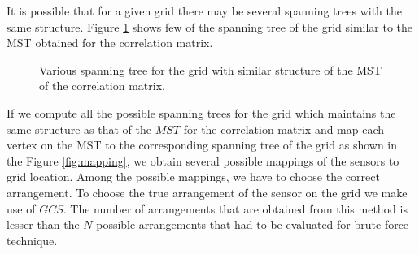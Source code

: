It is possible that for a given grid there may be several spanning trees with the same structure. 
Figure \ref{fig:variousMappings} shows few of the spanning tree of the grid similar to the MST obtained for the correlation matrix.
\begin{figure}[!ht]

\caption{Various spanning tree for the grid with similar structure of the MST of the correlation matrix.}
\label{fig:variousMappings}
\end{figure}


If we compute all the possible spanning trees for the grid which maintains the same structure as that of the $MST$ for the correlation matrix and map each vertex on the MST to the corresponding spanning tree of the grid as shown in the Figure \ref{fig:mapping}, we obtain several possible mappings of the sensors to grid location. Among the possible mappings, we have to choose the correct arrangement. To choose the true arrangement of the sensor on the grid we make use of  $GCS$. 
The number of arrangements that are obtained from this method is lesser than the ${N}$  possible arrangements that had to be evaluated for brute force technique.

